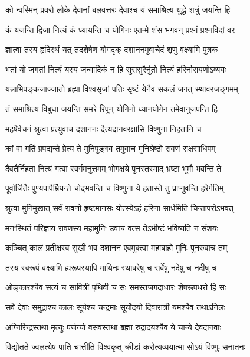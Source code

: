 \twolineshloka
{को न्वस्मिन् प्रवरो लोके देवानां बलवत्तरः}
{देवाश्च यं समाश्रित्य युद्धे शत्रुं जयन्ति हि} %

\twolineshloka
{कं यजन्ति द्विजा नित्यं कं ध्यायन्ति च योगिनः}
{एतन्मे शंस भगवन् प्रश्नं प्रश्नविदां वर} %

\twolineshloka
{ज्ञात्वा तस्य हृदिस्थं यत् तदशेषेण योगदृक्}
{दशाननमुवाचेदं शृणु वक्ष्यामि पुत्रक} %

\twolineshloka
{भर्ता यो जगतां नित्यं यस्य जन्मादिकं न हि}
{सुरासुरैर्नुतो नित्यं हरिर्नारायणोऽव्ययः} %

\twolineshloka
{यन्नाभिपङ्कजाज्जातो ब्रह्मा विश्वसृजां पतिः}
{सृष्टं येनैव सकलं जगत् स्थावरजङ्गमम्} %

\twolineshloka
{तं समाश्रित्य विबुधा जयन्ति समरे रिपून्}
{योगिनो ध्यानयोगेन तमेवानुजपन्ति हि} %

\twolineshloka
{महर्षेर्वचनं श्रुत्वा प्रत्युवाच दशाननः}
{दैत्यदानवरक्षांसि विष्णुना निहतानि च} %

\twolineshloka
{कां वा गतिं प्रपद्यन्ते प्रेत्य ते मुनिपुङ्गव}
{तमुवाच मुनिश्रेष्ठो रावणं राक्षसाधिपम्} %

\twolineshloka
{दैवतैर्निहता नित्यं गत्वा स्वर्गमनुत्तमम्}
{भोगक्षये पुनस्तस्माद् भ्रष्टा भूमौ भवन्ति ते} %

\twolineshloka
{पूर्वार्जितैः पुण्यपापैर्म्रियन्ते चोद्भवन्ति च}
{विष्णुना ये हतास्ते तु प्राप्नुवन्ति हरेर्गतिम्} %

\twolineshloka
{श्रुत्वा मुनिमुखात् सर्वं रावणो हृष्टमानसः}
{योत्स्येऽहं हरिणा सार्धमिति चिन्तापरोऽभवत्} %

\twolineshloka
{मनःस्थितं परिज्ञाय रावणस्य महामुनिः}
{उवाच वत्स तेऽभीष्टं भविष्यति न संशयः} %

\twolineshloka
{कञ्चित् कालं प्रतीक्षस्व सुखी भव दशानन}
{एवमुक्त्वा महाबाहो मुनिः पुनरुवाच तम्} %

\twolineshloka
{तस्य स्वरूपं वक्ष्यामि ह्यरूपस्यापि मायिनः}
{स्थावरेषु च सर्वेषु नदेषु च नदीषु च} %

\twolineshloka
{ओङ्कारश्चैव सत्यं च सावित्री पृथिवी च सः}
{समस्तजगदाधारः शेषरूपधरो हि सः} %

\twolineshloka
{सर्वे देवाः समुद्राश्च कालः सूर्यश्च चन्द्रमाः}
{सूर्योदयो दिवारात्री यमश्चैव तथाऽनिलः} %

\twolineshloka
{अग्निरिन्द्रस्तथा मृत्युः पर्जन्यो वसवस्तथा}
{ब्रह्मा रुद्रादयश्चैव ये चान्ये देवदानवाः} %

\twolineshloka
{विद्योतते ज्वलत्येष पाति चात्तीति विश्वकृत्}
{क्रीडां करोत्यव्ययात्मा सोऽयं विष्णुः सनातनः} %

